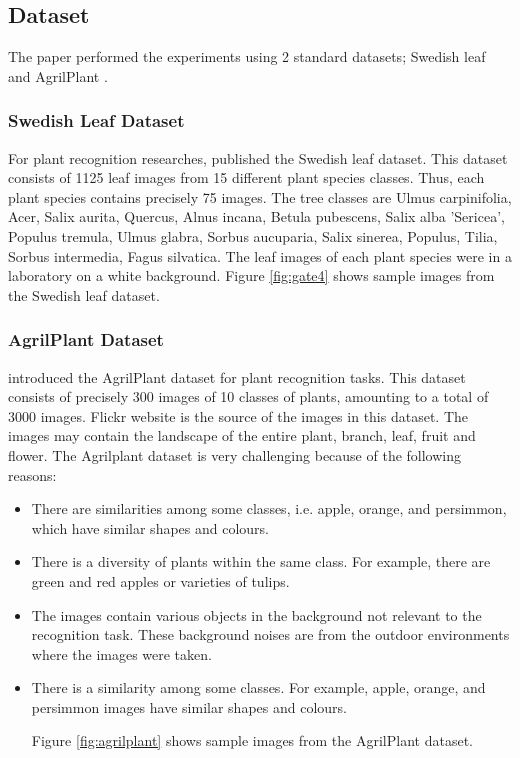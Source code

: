 \documentclass[conference]{IEEEtran}
\begin{document}
\subsection{Dataset}
The paper performed the experiments using 2 standard datasets; Swedish leaf \cite{soderkvist2001computer} and AgrilPlant \cite{pawara2017comparing}.

\subsubsection{Swedish Leaf Dataset}
For plant recognition researches, \cite{soderkvist2001computer} published the Swedish leaf dataset. This dataset consists of 1125 leaf images from 15 different plant species classes. Thus, each plant species contains precisely 75 images. The tree classes are Ulmus carpinifolia, Acer, Salix aurita, Quercus, Alnus incana, Betula pubescens, Salix alba 'Sericea', Populus tremula, Ulmus glabra, Sorbus aucuparia, Salix sinerea, Populus, Tilia, Sorbus intermedia, Fagus silvatica. The leaf images of each plant species were in a laboratory on a white background. Figure \ref{fig:gate4} shows sample images from the Swedish leaf dataset.


\subsubsection{AgrilPlant Dataset}
 \cite{pawara2017comparing} introduced the AgrilPlant dataset for plant recognition tasks. This dataset consists of precisely 300 images of 10 classes of plants, amounting to a total of 3000 images. Flickr website is the source of the images in this dataset. The images may contain the landscape of the entire plant, branch, leaf, fruit and flower. The Agrilplant dataset is very challenging because of the following reasons:
 
 \begin{itemize}
     \item There are similarities among some classes, i.e. apple, orange, and persimmon, which have similar shapes and colours.
     \item There is a diversity of plants within the same class. For example, there are green and red apples or varieties of tulips.
     \item The images contain various objects in the background not relevant to the recognition task. These background noises are from the outdoor environments where the images were taken.
     \item There is a similarity among some classes. For example, apple, orange, and persimmon images have similar shapes and colours.

Figure \ref{fig:agrilplant} shows sample images from the AgrilPlant dataset.

 \end{itemize}
 
\end{document}
